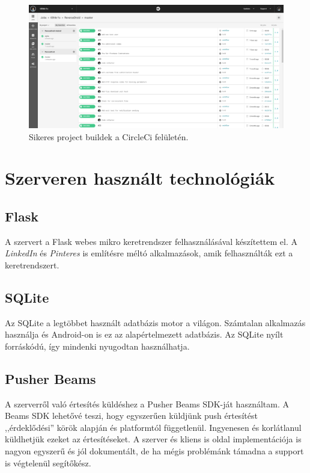 \documentclass{thesis-ekf}
\theoremstyle{definition}
\theoremstyle{remark}
\begin{document}
\begin{figure}[!h]
	\centering
	\includegraphics[width=15cm]{pictures/circle_ci}
	\caption{Sikeres project buildek a CircleCi felületén.}
	\label{circleci}
\end{figure}

\newpage

\section{Szerveren használt technológiák}

\subsection*{Flask}

A szervert a Flask webes mikro keretrendszer felhasználásával készítettem el.
A \emph{LinkedIn} és \emph{Pinteres} is említésre méltó alkalmazások, amik felhasználták ezt a keretrendszert.

\subsection*{SQLite}

Az SQLite a legtöbbet használt adatbázis motor a világon. 
Számtalan alkalmazás használja és Android-on is ez az alapértelmezett adatbázis.
Az SQLite nyílt forráskódú, így mindenki nyugodtan használhatja.

\subsection*{Pusher Beams}

A szerverről való értesítés küldéshez a Pusher Beams SDK-ját használtam.
A Beams SDK lehetővé teszi, hogy egyszerűen küldjünk push értesítést ,,érdeklődési'' körök alapján és platformtól függetlenül.
Ingyenesen és korlátlanul küldhetjük ezeket az értesítéseket.
A szerver és kliens is oldal implementációja is nagyon egyszerű és jól dokumentált, de ha mégis problémánk támadna a support is  végtelenül segítőkész.
\end{document}
